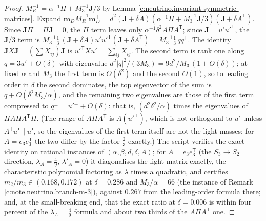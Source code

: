 \documentclass[11pt]{article}
\theoremstyle{definition}
\theoremstyle{plain}
\providecommand{\J}{}\renewcommand{\J}{\mathbf{J}}
\providecommand{\mD}{}\renewcommand{\mD}{\mathbf{m}_{D}}
\begin{document}
\begin{proof}
$M_{R}^{-1} = \alpha^{-1}\Pi + M_{3}^{-1}\J/3$ by Lemma \ref{c:neutrino.invariant-symmetric-matrices}. Expand $\mD M_{R}^{-1}\mD^{\mathsf{T}} = d^{2}(\J + \delta A)(\alpha^{-1}\Pi + M_{3}^{-1}\J/3)(\J + \delta A^{\mathsf{T}})$. Since $\J\Pi = \Pi\J = 0$, the $\Pi$ term leaves only $\alpha^{-1}\delta^{2}A\Pi A^{\mathsf{T}}$; since $\J = u'u'^{\mathsf{T}}$, the $\J/3$ term is $M_{3}^{-1}\tfrac13\,(\J + \delta A)u'u'^{\mathsf{T}}(\J + \delta A^{\mathsf{T}}) = M_{3}^{-1}\tfrac13\,qq^{\mathsf{T}}$. The identity $\J X\J = (\sum X_{ij})\J$ is $u'^{\mathsf{T}}Xu' = \sum_{ij}X_{ij}$. The second term is rank one along $q = 3u' + O(\delta)$ with eigenvalue $d^{2}|q|^{2}/(3M_{3}) = 9d^{2}/M_{3}\,(1 + O(\delta))$; at fixed $\alpha$ and $M_{3}$ the first term is $O(\delta^{2})$ and the second $O(1)$, so to leading order in $\delta$ the second dominates, the top eigenvector of the sum is $q + O(\delta^{2}M_{3}/\alpha)$, and the remaining two eigenvalues are those of the first term compressed to $q^{\perp} = u'^{\perp} + O(\delta)$: that is, $(d^{2}\delta^{2}/\alpha)$ times the eigenvalues of $\Pi A\Pi A^{\mathsf{T}}\Pi$. (The range of $A\Pi A^{\mathsf{T}}$ is $A(u'^{\perp})$, which is not orthogonal to $u'$ unless $A^{\mathsf{T}}u' \parallel u'$, so the eigenvalues of the first term itself are not the light masses; for $A = e_{3}e_{3}^{\mathsf{T}}$ the two differ by the factor $\tfrac23$ exactly.) The script verifies the exact identity on rational instances of $(\alpha, \beta, d, \delta, A)$; for $A = e_{3}e_{3}^{\mathsf{T}}$ (the $S_{3} \to S_{2}$ direction, $\lambda_{A} = \tfrac49$, $\lambda'_{A} = 0$) it diagonalises the light matrix exactly, the characteristic polynomial factoring as $\lambda$ times a quadratic, and certifies $m_{2}/m_{3} \in (0.168, 0.172)$ at $\delta = 0.286$ and $M_{3}/\alpha = 66$ (the instance of Remark \ref{c:note.neutrino.branch-m-3}), against $0.267$ from the leading-order formula there; and, at the small-breaking end, that the exact ratio at $\delta = 0.006$ is within four percent of the $\lambda_{A} = \tfrac49$ formula and about two thirds of the $A\Pi A^{\mathsf{T}}$ one.

\end{proof}
\end{document}
